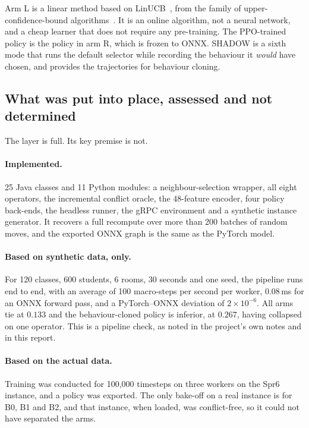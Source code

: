 Arm L is a linear method based on LinUCB~\cite{li2010linucb}, from the family of
upper-confidence-bound algorithms~\cite{auer2002ucb}. It is an online algorithm, not a neural
network, and a cheap learner that does not require any pre-training. The PPO-trained policy is
the policy in arm R, which is frozen to ONNX. SHADOW is a sixth mode that runs the default
selector while recording the behaviour it \emph{would} have chosen, and provides the trajectories
for behaviour cloning.

\subsection{What was put into place, assessed and not determined}

The layer is full. Its key premise is not.

\paragraph{Implemented.} 25 Java classes and 11 Python modules: a neighbour-selection wrapper, all
eight operators, the incremental conflict oracle, the 48-feature encoder, four policy back-ends,
the headless runner, the gRPC environment and a synthetic instance generator. It recovers a full
recompute over more than 200 batches of random moves, and the exported ONNX graph is the same as
the PyTorch model.

\paragraph{Based on synthetic data, only.} For 120 classes, 600 students, 6 rooms, 30 seconds and
one seed, the pipeline runs end to end, with an average of 100 macro-steps per second per worker,
0.08\,ms for an ONNX forward pass, and a PyTorch--ONNX deviation of $2\times10^{-6}$. All arms tie
at $0.133$ and the behaviour-cloned policy is inferior, at $0.267$, having collapsed on one
operator. This is a pipeline check, as noted in the project's own notes and in this report.

\paragraph{Based on the actual data.} Training was conducted for 100{,}000 timesteps on three
workers on the Spr6 instance, and a policy was exported. The only bake-off on a real instance is
for B0, B1 and B2, and that instance, when loaded, was conflict-free, so it could not have
separated the arms.

